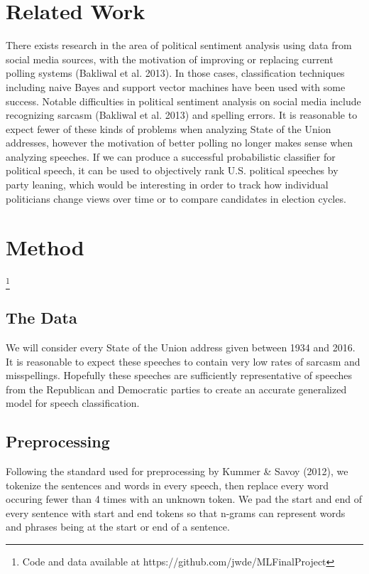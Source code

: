 \documentclass{amsart}
\theoremstyle{definition}
\theoremstyle{remark}
\numberwithin{equation}{section}
\begin{document}
\section{Related Work}
There exists research in the area of political sentiment analysis using data from social media sources, with the motivation of improving or replacing current polling systems (Bakliwal et al. 2013). In those cases, classification techniques including naive Bayes and support vector machines have been used with some success. Notable difficulties in political sentiment analysis on social media include recognizing sarcasm (Bakliwal et al. 2013) and spelling errors. It is reasonable to expect fewer of these kinds of problems when analyzing State of the Union addresses, however the motivation of better polling no longer makes sense when analyzing speeches. If we can produce a successful probabilistic classifier for political speech, it can be used to objectively rank U.S. political speeches by party leaning, which would be interesting in order to track how individual politicians change views over time or to compare candidates in election cycles.\\

\section{Method}\footnote{Code and data available at https://github.com/jwde/MLFinalProject}
\subsection{The Data}
We will consider every State of the Union address given between 1934 and 2016. It is reasonable to expect these speeches to contain very low rates of sarcasm and misspellings. Hopefully these speeches are sufficiently representative of speeches from the Republican and Democratic parties to create an accurate generalized model for speech classification.\\
\subsection{Preprocessing}
Following the standard used for preprocessing by Kummer \& Savoy (2012), we tokenize the sentences and words in every speech, then replace every word occuring fewer than 4 times with an unknown token. We pad the start and end of every sentence with start and end tokens so that n-grams can represent words and phrases being at the start or end of a sentence.\\
\end{document}
